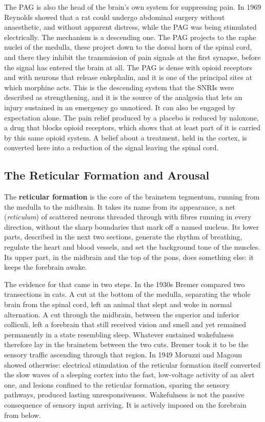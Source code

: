 \documentclass[11pt]{article}
\begin{document}
The PAG is also the head of the brain's own system for suppressing pain. In 1969 Reynolds showed that a rat could undergo abdominal surgery without anaesthetic, and without apparent distress, while the PAG was being stimulated electrically. The mechanism is a descending one. The PAG projects to the raphe nuclei of the medulla, these project down to the dorsal horn of the spinal cord, and there they inhibit the transmission of pain signals at the first synapse, before the signal has entered the brain at all. The PAG is dense with opioid receptors and with neurons that release enkephalin, and it is one of the principal sites at which morphine acts. This is the descending system that the SNRIs were described as strengthening, and it is the source of the analgesia that lets an injury sustained in an emergency go unnoticed. It can also be engaged by expectation alone. The pain relief produced by a placebo is reduced by naloxone, a drug that blocks opioid receptors, which shows that at least part of it is carried by this same opioid system. A belief about a treatment, held in the cortex, is converted here into a reduction of the signal leaving the spinal cord.

\subsection{The Reticular Formation and Arousal}

The \textbf{reticular formation} is the core of the brainstem tegmentum, running from the medulla to the midbrain. It takes its name from its appearance, a net (\textit{reticulum}) of scattered neurons threaded through with fibres running in every direction, without the sharp boundaries that mark off a named nucleus. Its lower parts, described in the next two sections, generate the rhythm of breathing, regulate the heart and blood vessels, and set the background tone of the muscles. Its upper part, in the midbrain and the top of the pons, does something else: it keeps the forebrain awake.

The evidence for that came in two steps. In the 1930s Bremer compared two transections in cats. A cut at the bottom of the medulla, separating the whole brain from the spinal cord, left an animal that slept and woke in normal alternation. A cut through the midbrain, between the superior and inferior colliculi, left a forebrain that still received vision and smell and yet remained permanently in a state resembling sleep. Whatever sustained wakefulness therefore lay in the brainstem between the two cuts. Bremer took it to be the sensory traffic ascending through that region. In 1949 Moruzzi and Magoun showed otherwise: electrical stimulation of the reticular formation itself converted the slow waves of a sleeping cortex into the fast, low-voltage activity of an alert one, and lesions confined to the reticular formation, sparing the sensory pathways, produced lasting unresponsiveness. Wakefulness is not the passive consequence of sensory input arriving. It is actively imposed on the forebrain from below.
\end{document}
